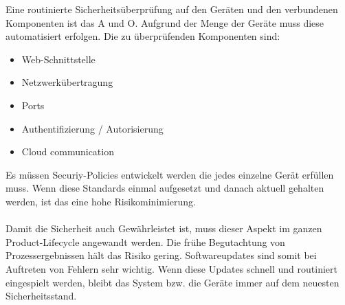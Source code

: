 \documentclass{report}
\begin{document}
Eine routinierte Sicherheitsüberprüfung auf den Geräten und den verbundenen Komponenten ist das A und O. Aufgrund der Menge der Geräte muss diese automatisiert erfolgen. Die zu überprüfenden Komponenten sind:

\begin{itemize}
\item Web-Schnittstelle
\item Netzwerkübertragung
\item Ports
\item Authentifizierung / Autorisierung
\item Cloud communication
\end{itemize}
Es müssen Securiy-Policies entwickelt werden die jedes einzelne Gerät erfüllen muss. Wenn diese Standards einmal aufgesetzt und danach aktuell gehalten werden, ist das eine hohe Risikominimierung.
\\
\\
Damit die Sicherheit auch Gewährleistet ist, muss dieser Aspekt im ganzen Product-Lifecycle angewandt werden. Die frühe Begutachtung von Prozessergebnissen hält das Risiko gering. Softwareupdates sind somit bei Auftreten von Fehlern sehr wichtig. Wenn diese Updates schnell und routiniert eingespielt werden, bleibt das System bzw. die Geräte immer auf dem neuesten Sicherheitsstand.




\end{document}
